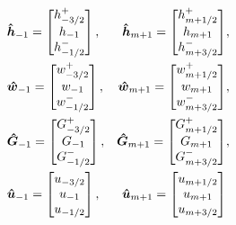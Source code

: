 \begin{align*}
&\boldsymbol{\hat{h}}_{-1} = \begin{bmatrix}
h^+_{-3/2} \\ h_{-1} \\ h^-_{-1/2} \end{bmatrix},&\boldsymbol{\hat{h}}_{m+1} = \begin{bmatrix}
h^+_{m+1/2} \\ h_{m+1} \\h^-_{m+3/2} \end{bmatrix}&, \\
&\boldsymbol{\hat{w}}_{-1} = \begin{bmatrix}
w^+_{-3/2} \\ w_{-1} \\ w^-_{-1/2}\end{bmatrix},&\boldsymbol{\hat{w}}_{m+1} = \begin{bmatrix}
w^+_{m+1/2} \\ w_{m+1} \\ w^-_{m+3/2}\end{bmatrix}&, \\
&\boldsymbol{\hat{G}}_{-1} = \begin{bmatrix}
G^+_{-3/2} \\ G_{-1} \\ G^-_{-1/2}\end{bmatrix},&\boldsymbol{\hat{G}}_{m+1} = \begin{bmatrix}
G^+_{m+1/2} \\ G_{m+1} \\ G^-_{m+3/2}\end{bmatrix}&, \\
&\boldsymbol{\hat{u}}_{-1} = \begin{bmatrix}
u_{-3/2} \\ u_{-1} \\ u_{-1/2}\end{bmatrix},&\boldsymbol{\hat{u}}_{m+1} = \begin{bmatrix}
u_{m+1/2} \\ u_{m+1} \\ u_{m+3/2}\end{bmatrix}&
\end{align*}
